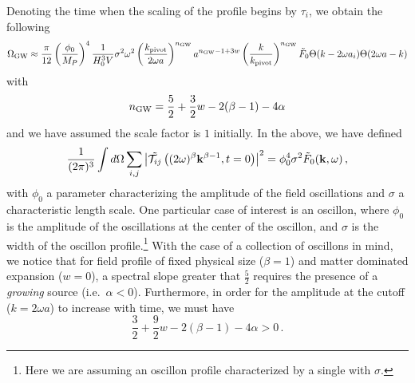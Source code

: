 \documentclass{revtex4}
\begin{document}
Denoting the time when the scaling of the profile begins by $\tau_i$, we obtain the following
\begin{equation}
  \Omega_{\rm GW} \approx \frac{\pi}{12}\left(\frac{\phi_0}{M_P}\right)^4\frac{1}{H_0^3V}\sigma^2\omega^2\left(\frac{k_{\rm pivot}}{2\omega a}\right)^{n_{\rm GW}}a^{n_{\rm GW} - 1 + 3w}\left(\frac{k}{k_{\rm pivot}}\right)^{n_{\rm GW}} \tilde{F}_0 \Theta(k-2\omega a_i)\Theta(2\omega a - k)
\end{equation}
with
\begin{equation}
  n_{\rm GW} = \frac{5}{2} + \frac{3}{2}w - 2(\beta-1) - 4\alpha 
\end{equation}
and we have assumed the scale factor is $1$ initially.
In the above, we have defined
\begin{equation}
  \frac{1}{(2\pi)^3}\int d\Omega \sum_{i,j}\left|\tilde{\mathcal{T}_{ij}}\left((2\omega)^\beta {\bf k}^{\beta-1},t=0\right)\right|^2 = \phi_0^4\sigma^2 \tilde{F}_0({\bf k},\omega) \, ,
\end{equation}
with $\phi_0$ a parameter characterizing the amplitude of the field oscillations and $\sigma$ a characteristic length scale.
One particular case of interest is an oscillon, where $\phi_0$ is the amplitude of the oscillations at the center of the oscillon, and $\sigma$ is the width of the oscillon profile.\footnote{Here we are assuming an oscillon profile characterized by a single with $\sigma$.}
With the case of a collection of oscillons in mind, we notice that for field profile of fixed physical size ($\beta=1$) and matter dominated expansion ($w=0$), a spectral slope greater that $\frac{5}{2}$ requires the presence of a \emph{growing} source (i.e.\ $\alpha < 0$).
Furthermore, in order for the amplitude at the cutoff ($k=2\omega a$) to increase with time, we must have
\begin{equation}
  \frac{3}{2} + \frac{9}{2}w - 2(\beta-1) - 4\alpha > 0 \, .
\end{equation}


\end{document}
